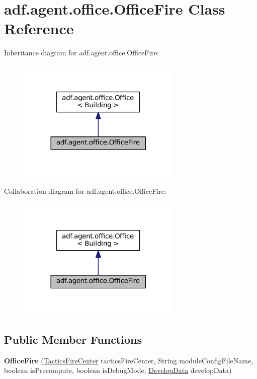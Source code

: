 \hypertarget{classadf_1_1agent_1_1office_1_1OfficeFire}{}\section{adf.\+agent.\+office.\+Office\+Fire Class Reference}
\label{classadf_1_1agent_1_1office_1_1OfficeFire}


Inheritance diagram for adf.\+agent.\+office.\+Office\+Fire\+:
\nopagebreak
\begin{figure}[H]
\begin{center}
\leavevmode
\includegraphics[width=221pt]{classadf_1_1agent_1_1office_1_1OfficeFire__inherit__graph}
\end{center}
\end{figure}


Collaboration diagram for adf.\+agent.\+office.\+Office\+Fire\+:
\nopagebreak
\begin{figure}[H]
\begin{center}
\leavevmode
\includegraphics[width=221pt]{classadf_1_1agent_1_1office_1_1OfficeFire__coll__graph}
\end{center}
\end{figure}
\subsection*{Public Member Functions}
\begin{DoxyCompactItemize}
\item 
\hypertarget{classadf_1_1agent_1_1office_1_1OfficeFire_acf46d15f2903f3c9d23834b6d8d85a73}{}\label{classadf_1_1agent_1_1office_1_1OfficeFire_acf46d15f2903f3c9d23834b6d8d85a73} 
{\bfseries Office\+Fire} (\hyperlink{classadf_1_1component_1_1tactics_1_1center_1_1TacticsFireCenter}{Tactics\+Fire\+Center} tactics\+Fire\+Center, String module\+Config\+File\+Name, boolean is\+Precompute, boolean is\+Debug\+Mode, \hyperlink{classadf_1_1agent_1_1develop_1_1DevelopData}{Develop\+Data} develop\+Data)
\end{DoxyCompactItemize}
